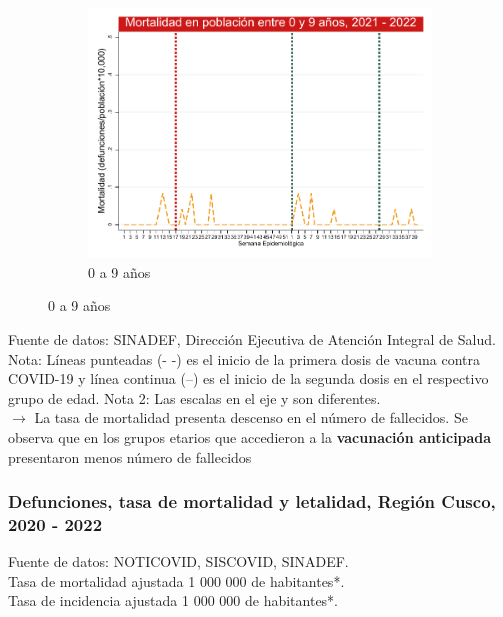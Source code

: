 \documentclass[xcolor=table]{beamer}
\begin{document}
\begin{frame}
\begin{figure}
\begin{subfigure}[b]{0.3\textwidth}
			\includegraphics[width=\textwidth]{../figuras/mortalidad_edad_0.pdf}
			\caption{0 a 9 años}
		\end{subfigure}
		\vspace{10mm}	
	\end{figure}
	\vspace{-.8cm} 
	{\tiny Fuente de datos: SINADEF, Dirección Ejecutiva de Atención Integral de Salud.\\}
	{\tiny Nota: Líneas punteadas (- -) es el inicio de la primera dosis de vacuna contra COVID-19 y línea continua (--) es el inicio de la segunda dosis en el respectivo grupo de edad. Nota 2: Las escalas en el eje y son diferentes.\\}
	$\rightarrow$ {\small La tasa de mortalidad presenta descenso en el número de fallecidos. Se observa que en los grupos etarios que accedieron a la \textbf{\color{mycolor3}vacunación anticipada} presentaron menos número de fallecidos}  \hyperlink{indice}{}
\end{frame}

\begin{frame}
	\frametitle{Defunciones, tasa de mortalidad y letalidad, Región Cusco, 2020 - 2022}
	\vspace{-1.0cm}
	\begin{table}[]
		\resizebox{\textwidth}{!}{%
			
		}
	\end{table}	
	{   \tiny Fuente de datos: NOTICOVID, SISCOVID, SINADEF.\\
		Tasa de mortalidad ajustada 1 000 000 de habitantes*.\\
		Tasa de incidencia ajustada 1 000 000 de habitantes*.\\ 
	}
\end{frame}
\end{document}

